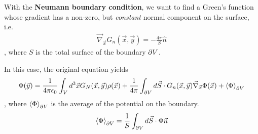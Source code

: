 With the \textbf{Neumann boundary condition}, we want to find a Green's function whose gradient has a non-zero, but \emph{constant} normal component on the surface, i.e.
\begin{align*}
  \vec{\nabla}_{\vec{x}}G_n(\vec{x},\vec{y}) = - \frac{4 \pi}{S}\hat{n}
\end{align*}
, where $S$ is the total surface of the boundary $\partial V$.

In this case, the original equation yields
\begin{align*}
  \Phi(\vec{y}) = \frac{1}{4 \pi \epsilon_0} \int_V d^{3} \vec{x} G_N(\vec{x},\vec{y}) \rho(\vec{x}) + \frac{1}{4 \pi}\int_{\partial V}d \vec{S} \cdot G_n(\vec{x},\vec{y}) \vec{\nabla}_{\vec{x}} \Phi(\vec{x}) + \left<\Phi\right>_{\partial V}
\end{align*}
, where $\left<\Phi\right>_{\partial V}$ is the average of the potential on the boundary.
\begin{align*}
  \left<\Phi\right>_{\partial V} = \frac{1}{S}\int_{\partial V}d \vec{S} \cdot \Phi \vec{n}
\end{align*}


